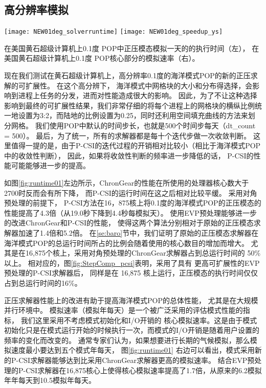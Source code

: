 \subsection{高分辨率模拟}
\begin {figure*}[t!]
\begin{center}
\texttt{[image: NEW01deg\_solverruntime]}
\hspace{10pt}
\texttt{[image: NEW01deg\_speedup\_ys]}
\end{center}
\caption []{ 在美国黄石超级计算机上0.1度 POP中正压模态模拟一天的的执行时间（左）， 
在美国黄石超级计算机上0.1度 POP核心部分的模拟速率（右）。\label {fig:runtime01}}
\end {figure*}


现在我们测试在黄石超级计算机上，高分辨率0.1度的海洋模式POP的新的正压求解的可扩展性。 
在这个高分辨下， 海洋模式中网格块的大小和分布得选择，会影响到进程上任务的分发，进而对性能造成很大的影响。 
因此，为了不让这种选择影响到最终的可扩展性结果，我们非常仔细的将每个进程上的网格块的横纵比例统一地设置为3:2，而陆地的比例设置为0.25，同时还利用空间填充曲线的方法来划分网格。 
我们使用POP中默认的时间步长，也就是500个时间步每天（dt\_count = 500）。 
最后，为了统一，所有的求解器都是每十个迭代步做一次收敛判断。 
这里值得一提的是，由于P-CSI的迭代过程的开销相对比较小（相比于海洋模式POP中的收敛性判断）， 因此，如果将收敛性判断的频率进一步降低的话， P-CSI的性能可能能够进一步的提高。 
 

如图\ref{fig:runtime01}左边所示，ChronGear的性能在所使用的处理器核心数大于2700时反而会有所下降，
而P-CSI的运行时间在这之后相对比较平缓。 
采用对角预处理的前提下， P-CSI方法在16，875核上将0.1度的海洋模式POP的正压模态的性能提高了4.3倍（从19.0秒下降到4.4秒每模拟天）。 
使用EVP预处理能够进一步的改进ChronGear和P-CSI的性能， 使得这两个算法分别相对于原始的正压模态求解器加速了1.4倍和5.2倍。
在\ref{se:baro}节中，我们证明了原始的正压模态求解器在海洋模式POP的总运行时间所占的比例会随着使用的核心数目的增加而增大。
尤其是在16,875个核上，采用对角预处理的ChronGear求解器占到总运行时间的 50\%以上。 
相对应的，图\ref{fig:StepComp_pcsi}表明，采用了具有 更高可扩展性的EVP预处理的P-CSI求解器后， 同样是在 16,875 核上运行，正压模态的执行时间仅仅占到总运行时间的16\%。 

 
正压求解器性能上的改进有助于提高海洋模式POP的总体性能， 尤其是在大规模并行环境中。
模拟速率（模拟年每天）是一个被广泛采用的评估模式性能的指标， 我们这里采用不考虑模式初始化和I/O开销的 核心模拟速率。这是由于模式初始化只是在模式运行开始的时候执行一次，而模式的I/O开销是随着用户设置的频率的变化而改变的。 
通常专家们认为，如果想要进行长期的气候模拟，那么模拟速度最小要达到五个模式年每天\cite{dennis2012computational}， 图\ref{fig:runtime01} 右边可以看出，模式采用新的P-CSI求解器能够达到比采用ChronGear求解器更高的模拟速率。 
结合EVP预处理的P-CSI求解器在16,875核心上使得核心模拟速率提高了1.7倍，从原来的6.2模拟年年每天到10.5模拟年每天。 
 

